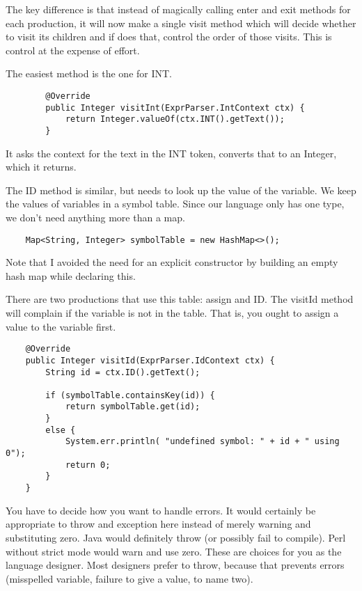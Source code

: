 The key difference is that instead of magically calling enter and
exit methods for each production, it will now make a single visit method
which will decide whether to visit its children and if does that,
control the order of those visits. This is control at the expense of effort.

The easiest method is the one for INT.

{\footnotesize
\begin{verbatim}
        @Override
        public Integer visitInt(ExprParser.IntContext ctx) {
            return Integer.valueOf(ctx.INT().getText());
        }
\end{verbatim}
}

It asks the context for the text in the INT token, converts that
to an Integer, which it returns.

The ID method is similar, but needs to look up the value of the variable.
We keep the values of variables in a symbol table. Since our language
only has one type, we don't need anything more than a map.

{\footnotesize
\begin{verbatim}
    Map<String, Integer> symbolTable = new HashMap<>();
\end{verbatim}
}

Note that I avoided the need for an explicit constructor by building
an empty hash map while declaring this.

There are two productions that use this table: assign and ID. The visitId
method will complain if the variable is not in the table. That is, you ought
to assign a value to the variable first.

{\footnotesize
\begin{verbatim}
    @Override
    public Integer visitId(ExprParser.IdContext ctx) {
        String id = ctx.ID().getText();

        if (symbolTable.containsKey(id)) {
            return symbolTable.get(id);
        }
        else {
            System.err.println( "undefined symbol: " + id + " using 0");
            return 0;
        }
    }
\end{verbatim}
}

You have to decide how you want to handle errors. It would certainly
be appropriate to throw and exception here instead of merely warning
and substituting zero. Java would definitely throw (or possibly fail
to compile). Perl without strict mode would warn and use zero. These
are choices for you as the language designer. Most designers prefer to
throw, because that prevents errors (misspelled variable, failure to
give a value, to name two).

